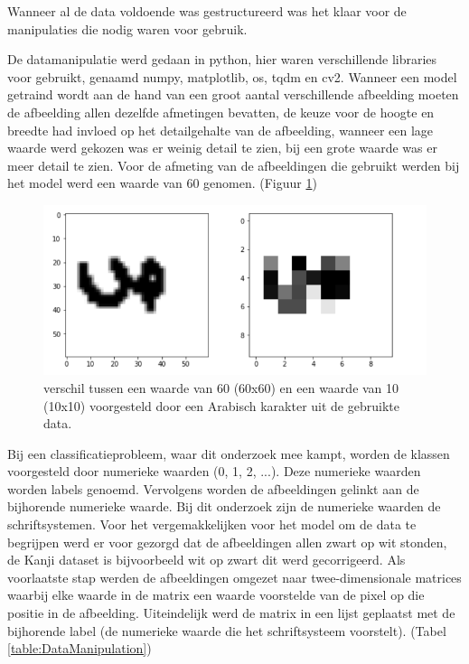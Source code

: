Wanneer al de data voldoende was gestructureerd was het klaar voor de manipulaties die nodig waren voor gebruik.

De datamanipulatie werd gedaan in python, hier waren verschillende libraries voor gebruikt, genaamd numpy, matplotlib, os, tqdm en cv2.
Wanneer een model getraind wordt aan de hand van een groot aantal verschillende afbeelding moeten de afbeelding allen dezelfde afmetingen bevatten, de keuze voor de hoogte en breedte had invloed op het detailgehalte van de afbeelding, wanneer een lage waarde werd gekozen was er weinig detail te zien, bij een grote waarde was er meer detail te zien.
Voor de afmeting van de afbeeldingen die gebruikt werden bij het model werd een waarde van 60 genomen. (Figuur \ref{tab:afmetingen})


\begin{figure}
    
    
    \includegraphics[width=\linewidth]{img/Afmetingen.png}

    \caption{verschil tussen een waarde van 60 (60x60) en een waarde van 10 (10x10) voorgesteld door een Arabisch karakter uit de gebruikte data.}
    \label{tab:afmetingen}
    
\end{figure}

Bij een classificatieprobleem, waar dit onderzoek mee kampt, worden de klassen voorgesteld door numerieke waarden (0, 1, 2, ...). Deze numerieke waarden worden labels genoemd.
Vervolgens worden de afbeeldingen gelinkt aan de bijhorende numerieke waarde.
Bij dit onderzoek zijn de numerieke waarden de schriftsystemen.
Voor het vergemakkelijken voor het model om de data te begrijpen werd er voor gezorgd dat de afbeeldingen allen zwart op wit stonden, de Kanji dataset is bijvoorbeeld wit op zwart dit werd gecorrigeerd.
Als voorlaatste stap werden de afbeeldingen omgezet naar twee-dimensionale matrices waarbij elke waarde in de matrix een waarde voorstelde van de pixel op die positie in de afbeelding.
Uiteindelijk werd de matrix in een lijst geplaatst met de bijhorende label (de numerieke waarde die het schriftsysteem voorstelt). (Tabel \ref{table:DataManipulation})


